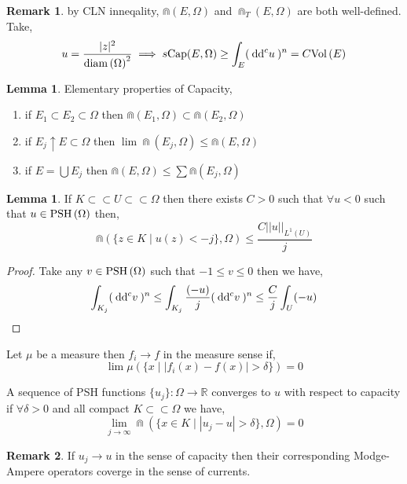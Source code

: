 \documentclass[12pt]{extarticle}
\newcommand{\R}{\mathbb{R}}
\renewcommand{\d}[1]{\: \mathrm{d}#1 \:}
\theoremstyle{definition}
\newtheorem{lemma}[theorem]{Lemma}
\newtheorem{remark}{Remark}
\newenvironment{definition}[1][Definition:]{\begin{trivlist}
\item[\hskip \labelsep {\bfseries #1}]}{\end{trivlist}}
\begin{document}
\begin{remark}
by CLN inneqality, $\Cap(E, \Omega)$ and $\Cap_T(E, \Omega)$ are both well-defined. Take,
\[ u = \frac{|z|^2}{\diam{\Omega}^2} \implies s\Cap(E, \Omega) \ge \int_E (\d{\dc{u}})^n = C \Vol{E} \]
\end{remark}

\begin{lemma}
Elementary properties of Capacity,
\begin{enumerate}
\item if $E_1 \subset E_2 \subset \Omega$ then $\Cap(E_1, \Omega) \subset \Cap(E_2, \Omega)$

\item if $E_j \uparrow E \subset \Omega$ then $\lim \Cap(E_j, \Omega) \le \Cap(E, \Omega)$

\item if $E = \bigcup E_j$ then $\Cap(E, \Omega) \le \sum \Cap(E_j, \Omega)$
\end{enumerate}
\end{lemma}

\begin{lemma}
If $K \subset \subset U \subset \subset \Omega$ then there exists $C > 0$ such that $\forall u < 0$ such that $u \in \mathrm{PSH}\left( \Omega \right)$ then,
\[ \Cap\left( \{ z \in K \mid u(z) < -j \}, \Omega \right) \le \frac{C ||u||_{L^1(U)}}{j} \]
\end{lemma}

\begin{proof}
Take any $v \in \mathrm{PSH}\left( \Omega \right)$ such that $-1 \le v \le 0$ then we have,
\[ \int_{K_j} (\d{\dc{v}})^n \le \int_{K_j} \frac{(-u)}{j} (\d{\dc{v}})^n  \le \frac{C}{j} \int_U (-u) \]
\end{proof}

\begin{definition}
Let $\mu$ be a measure then $f_i \to f$ in the measure sense if,
\[ \lim \mu(\{ x \mid |f_i(x) - f(x)| > \delta \}) = 0 \]
\end{definition}

\begin{definition}
A sequence of PSH functions $\{u_j\} : \Omega \to \R$ converges to $u$ with respect to capacity if $\forall \delta > 0$ and all compact $K \subset \subset \Omega$ we have,
\[ \lim_{j \to \infty} \Cap( \{ x \in K \mid |u_j - u| > \delta \}, \Omega) = 0 \]
\end{definition}

\begin{remark}
If $u_j \to u$ in the sense of capacity then their corresponding Modge-Ampere operators coverge in the sense of currents. 
\end{remark}
\end{document}
